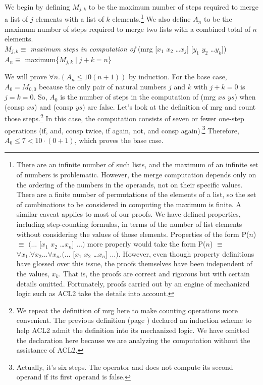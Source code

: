 We begin by defining $M_{j,k}$ to be the maximum number of steps required to merge a list
of $j$ elements with a list of $k$ elements.\footnote{There are an infinite number
of such lists, and the maximum of an infinite set of numbers is problematic.
However, the merge computation depends only
on the ordering of the numbers in the operands,
not on their specific values.
There are a finite number of permutations of the elements of a list,
so the set of combinations to be considered in computing the maximum is finite.
A similar caveat applies to most of our proofs.
We have defined properties, including step-counting formulas,
in terms of the number of list elements
without considering the values of those elements.
Properties of the form P($n$) $\equiv$ $(\dots$ [$x_1$ $x_2$ \dots $x_n$] $\dots)$
more properly would take the form
P($n$) $\equiv$ $\forall x_1.\forall x_2\dots\forall x_n.(\dots$ [$x_1$ $x_2$ \dots $x_n$] $\dots)$.
However, even though property definitions have glossed over this issue,
the proofs themselves have been independent of the values, $x_k$.
That is, the proofs are correct and rigorous but with certain details omitted.
Fortunately, proofs carried out by an engine of
mechanized logic such as ACL2 take the details into account.}
We also define $A_n$ to be the maximum number of steps required to merge two lists
with a combined total of $n$ elements.\\
\hspace*{1cm}$M_{j,k} \equiv$ \emph{maximum steps in computation of} \textsf{(mrg [$x_1$ $x_2$ \dots $x_j$] [$y_1$ $y_2$ \dots $y_k$])} \\
\hspace*{1cm}$A_n \equiv$ maximum\{$M_{j,k} \mid j + k = n$\}

We will
prove $\forall n.(A_n \leq 10(n+1))$ by induction.
For the base case, $A_0 = M_{0,0}$ because the only pair of natural
numbers $j$ and $k$ with $j + k = 0$ is $j = k = 0$.
So, $A_0$ is the number of steps in the computation of \textsf{(mrg $xs$ $ys$)}
when \textsf{(consp $xs$)} and \textsf{(consp $ys$)} are false.
Let's look at the definition of \textsf{mrg} and count those steps.\footnote{We
repeat the definition of \textsf{mrg} here to make counting operations more convenient.
The previous definition (page \pageref{defun:mrg})
declared an induction scheme to help ACL2
admit the definition into its mechanized logic.
We have omitted the declaration here because we are analyzing
the computation without the assistance of ACL2.}
In this case, the computation consists of seven or fewer one-step operations
(\textsf{if}, \textsf{and}, \textsf{consp} twice,
\textsf{if} again, \textsf{not}, and \textsf{consp} again).\footnote{Actually,
it's six steps. The operator \textsf{and} does not compute its second operand
if its first operand is false.}
Therefore, $A_0 \leq 7 < 10\cdot(0 + 1)$, which proves the base case.

